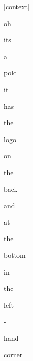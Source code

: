 \documentclass[varwidth]{standalone}
\begin{document}
\begin{CJK*}{UTF8}{gbsn}
{\setlength{\fboxsep}{0pt}\colorbox{white!0}{\parbox{0.9\textwidth}{
\colorbox{red!0.0005492301424965262}{\strut [context]} \colorbox{red!0.049569591879844666}{\strut oh} \colorbox{red!0.01324524823576212}{\strut its} \colorbox{red!0.029413903132081032}{\strut a} \colorbox{red!92.87593078613281}{\strut polo} \colorbox{red!0.32137519121170044}{\strut it} \colorbox{red!0.04636072367429733}{\strut has} \colorbox{red!0.01142896804958582}{\strut the} \colorbox{red!0.00851825438439846}{\strut logo} \colorbox{red!0.8453675508499146}{\strut on} \colorbox{red!0.06561561673879623}{\strut the} \colorbox{red!0.044183697551488876}{\strut back} \colorbox{red!0.5446022152900696}{\strut and} \colorbox{red!0.06866928189992905}{\strut at} \colorbox{red!0.02774762734770775}{\strut the} \colorbox{red!3.1450464725494385}{\strut bottom} \colorbox{red!0.9176903367042542}{\strut in} \colorbox{red!0.11408935487270355}{\strut the} \colorbox{red!0.7137054800987244}{\strut left} \colorbox{red!0.13816456496715546}{\strut -} \colorbox{red!0.012484872713685036}{\strut hand} \colorbox{red!0.006229747552424669}{\strut corner} 
}}}
\end{CJK*}
\end{document}
